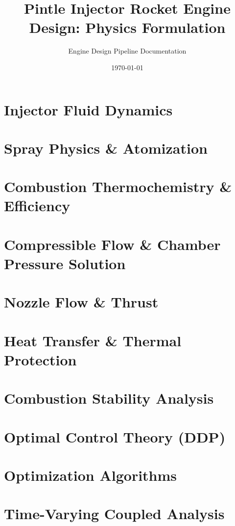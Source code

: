 \documentclass[11pt,a4paper]{report}
\title{Pintle Injector Rocket Engine Design: Physics Formulation}
\author{Engine Design Pipeline Documentation}
\date{\today}
\begin{document}
\maketitle

\tableofcontents

\chapter{Injector Fluid Dynamics}


\chapter{Spray Physics \& Atomization}


\chapter{Combustion Thermochemistry \& Efficiency}


\chapter{Compressible Flow \& Chamber Pressure Solution}


\chapter{Nozzle Flow \& Thrust}


\chapter{Heat Transfer \& Thermal Protection}


\chapter{Combustion Stability Analysis}


\chapter{Optimal Control Theory (DDP)}


\chapter{Optimization Algorithms}


\chapter{Time-Varying Coupled Analysis}

\end{document}
